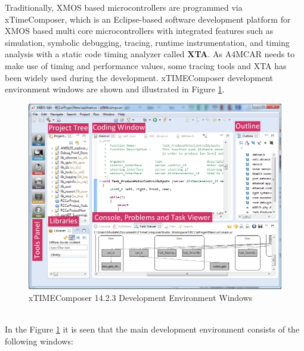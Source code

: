 Traditionally, XMOS based microcontrollers are programmed via xTimeComposer, which is an Eclipse-based software development platform for XMOS based multi core microcontrollers with integrated features such as simulation, symbolic debugging, tracing, runtime instrumentation, and timing analysis with a static code timing analyzer called \textbf{XTA}\cite{xmosflyer}. As A4MCAR needs to make use of timing and performance values, some tracing tools and XTA has been widely used during the development. xTIMEComposer development environment windows are shown and illustrated in Figure \ref{fig:xtimecomposerwindows}.
\begin{figure}[!ht]
	\centering
	\captionsetup{justification=centering}
	\includegraphics[scale=0.5]{content/images/xtimecomposerwindows.png}
	\caption{xTIMEComposer 14.2.3 Development Environment Windows}
	\label{fig:xtimecomposerwindows}
\end{figure} \\
In the Figure \ref{fig:xtimecomposerwindows} it is seen that the main development environment consists of the following windows:
